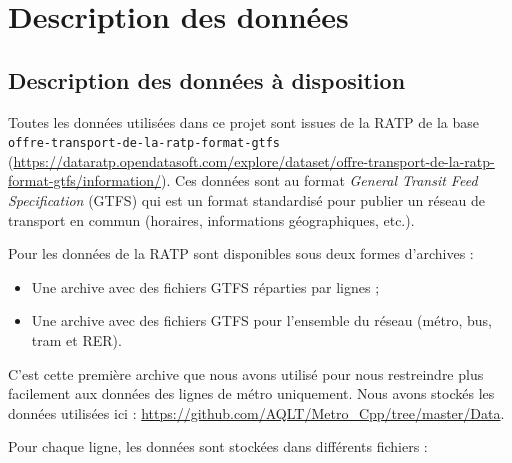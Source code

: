\documentclass[,french]{article}
\providecommand{\tightlist}{%
  \setlength{\itemsep}{0pt}\setlength{\parskip}{0pt}}
\begin{document}
\hypertarget{sec:def_donnees}{%
\section{Description des données}\label{sec:def_donnees}}

\hypertarget{description-des-donnuxe9es-uxe0-disposition}{%
\subsection{Description des données à
disposition}\label{description-des-donnuxe9es-uxe0-disposition}}

Toutes les données utilisées dans ce projet sont issues de la RATP de la
base \texttt{offre-transport-de-la-ratp-format-gtfs}
(\url{https://dataratp.opendatasoft.com/explore/dataset/offre-transport-de-la-ratp-format-gtfs/information/}).
Ces données sont au format \emph{General Transit Feed Specification}
(GTFS) qui est un format standardisé pour publier un réseau de transport
en commun (horaires, informations géographiques, etc.).

Pour les données de la RATP sont disponibles sous deux formes d'archives
:

\begin{itemize}
\tightlist
\item
  Une archive avec des fichiers GTFS réparties par lignes ;\\
\item
  Une archive avec des fichiers GTFS pour l'ensemble du réseau (métro,
  bus, tram et RER).
\end{itemize}

C'est cette première archive que nous avons utilisé pour nous
restreindre plus facilement aux données des lignes de métro uniquement.
Nous avons stockés les données utilisées ici :
\url{https://github.com/AQLT/Metro_Cpp/tree/master/Data}.

Pour chaque ligne, les données sont stockées dans différents fichiers :
\end{document}
